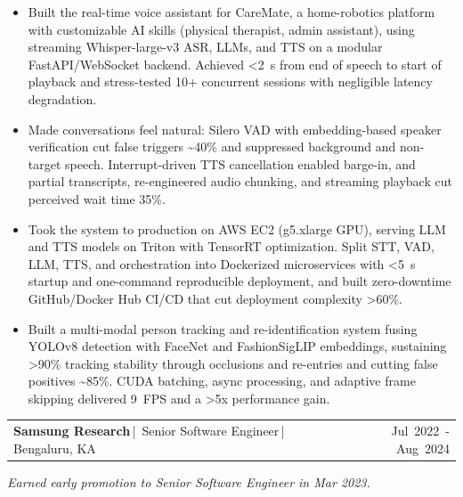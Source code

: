 \documentclass[letterpaper]{article}
\makeatletter
\newcommand{\job}[4]{\par\vspace{1.25pt}\noindent
\begin{tabularx}{\linewidth}{@{}>{\RaggedRight\arraybackslash}X@{\hspace{8pt}}r@{}}
\textbf{#1}\,|\, #2\,|\, #3 & \mbox{#4}
\end{tabularx}\par}
\makeatother
\begin{document}
\begin{itemize}
\item Built the real-time voice assistant for CareMate, a home-robotics platform with customizable AI skills (physical therapist, admin assistant), using streaming Whisper-large-v3 ASR, LLMs, and TTS on a modular FastAPI/WebSocket backend. Achieved <2~s from end of speech to start of playback and stress-tested 10+ concurrent sessions with negligible latency degradation.
\item Made conversations feel natural: Silero VAD with embedding-based speaker verification cut false triggers \textasciitilde40\% and suppressed background and non-target speech. Interrupt-driven TTS cancellation enabled barge-in, and partial transcripts, re-engineered audio chunking, and streaming playback cut perceived wait time 35\%.
\item Took the system to production on AWS EC2 (g5.xlarge GPU), serving LLM and TTS models on Triton with TensorRT optimization. Split STT, VAD, LLM, TTS, and orchestration into Dockerized microservices with <5~s startup and one-command reproducible deployment, and built zero-downtime GitHub/Docker Hub CI/CD that cut deployment complexity >60\%.
\item Built a multi-modal person tracking and re-identification system fusing YOLOv8 detection with FaceNet and FashionSigLIP embeddings, sustaining >90\% tracking stability through occlusions and re-entries and cutting false positives \textasciitilde85\%. CUDA batching, async processing, and adaptive frame skipping delivered 9~FPS and a >5x performance gain.
\end{itemize}
\job{Samsung Research}{Senior Software Engineer}{Bengaluru, KA}{Jul 2022 - Aug 2024}
\textit{Earned early promotion to Senior Software Engineer in Mar 2023.}\par
\end{document}
